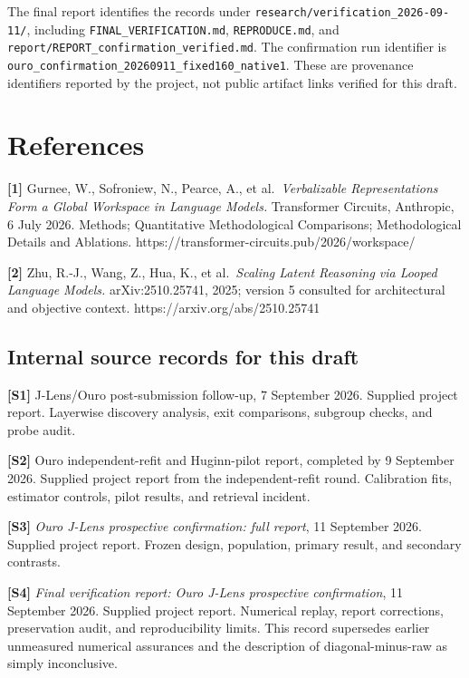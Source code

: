 \documentclass[
  11pt,
  a4paper,
]{article}
\begin{document}
The final report identifies the records under
\texttt{research/verification\_2026-09-11/}, including
\texttt{FINAL\_VERIFICATION.md}, \texttt{REPRODUCE.md}, and
\texttt{report/REPORT\_confirmation\_verified.md}. The confirmation run
identifier is \texttt{ouro\_confirmation\_20260911\_fixed160\_native1}.
These are provenance identifiers reported by the project, not public
artifact links verified for this draft.

\section{References}\label{references}

\textbf{{[}1{]}} Gurnee, W., Sofroniew, N., Pearce, A., et
al.~\emph{Verbalizable Representations Form a Global Workspace in
Language Models.} Transformer Circuits, Anthropic, 6 July 2026. Methods;
Quantitative Methodological Comparisons; Methodological Details and
Ablations. https://transformer-circuits.pub/2026/workspace/

\textbf{{[}2{]}} Zhu, R.-J., Wang, Z., Hua, K., et al.~\emph{Scaling
Latent Reasoning via Looped Language Models.} arXiv:2510.25741, 2025;
version 5 consulted for architectural and objective context.
https://arxiv.org/abs/2510.25741

\subsection{Internal source records for this
draft}\label{internal-source-records-for-this-draft}

\textbf{{[}S1{]}} J-Lens/Ouro post-submission follow-up, 7 September
2026. Supplied project report. Layerwise discovery analysis, exit
comparisons, subgroup checks, and probe audit.

\textbf{{[}S2{]}} Ouro independent-refit and Huginn-pilot report,
completed by 9 September 2026. Supplied project report from the
independent-refit round. Calibration fits, estimator controls, pilot
results, and retrieval incident.

\textbf{{[}S3{]}} \emph{Ouro J-Lens prospective confirmation: full
report}, 11 September 2026. Supplied project report. Frozen design,
population, primary result, and secondary contrasts.

\textbf{{[}S4{]}} \emph{Final verification report: Ouro J-Lens
prospective confirmation}, 11 September 2026. Supplied project report.
Numerical replay, report corrections, preservation audit, and
reproducibility limits. This record supersedes earlier unmeasured
numerical assurances and the description of diagonal-minus-raw as simply
inconclusive.
\end{document}
